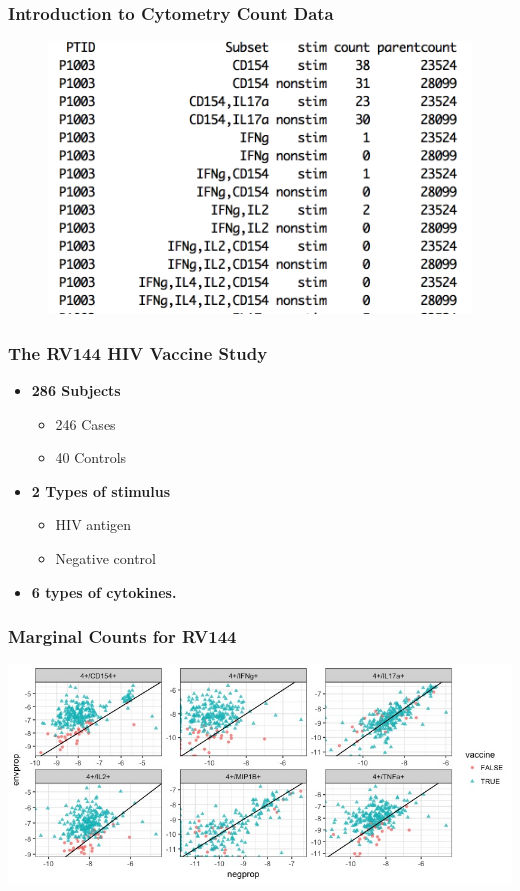 \documentclass{beamer}
\theoremstyle{definition}
\begin{document}

\begin{frame}
\frametitle{Introduction to Cytometry Count Data}
\begin{figure}[]
\includegraphics[width=12 cm]{figures/datasetExample} \caption{}
\end{figure}
\end{frame}


\begin{frame}
\frametitle{The RV144 HIV Vaccine Study}
\begin{itemize}
\item \textbf{286 Subjects}
	\begin{itemize}
	\item 246 Cases
	\item 40 Controls
	\end{itemize}
\vspace{0.2 cm}
\item \textbf{2 Types of stimulus} 
	\begin{itemize}
	\item HIV antigen
	\item Negative control
	\end{itemize}
\vspace{0.2 cm}
\item \textbf{6 types of cytokines.} 
\end{itemize}
\end{frame}


\begin{frame}
\frametitle{Marginal Counts for RV144}
\begin{center}
\includegraphics[scale=0.4]{figures/marginalScatterNoPost}
\end{center}
\end{frame}
\end{document}

